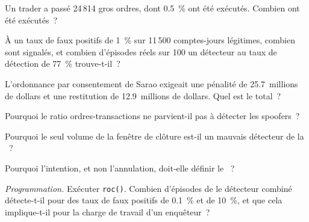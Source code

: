\begin{exercise}[$\star$]\label{exo:s2:manipulative-strategies-and-how-they-are-caught:1}
Un trader a passé 24\,814 gros ordres, dont 0.5~\% ont été exécutés. Combien ont été exécutés~?
\end{exercise}

\begin{exercise}[$\star$]\label{exo:s2:manipulative-strategies-and-how-they-are-caught:2}
À un taux de faux positifs de 1~\% sur 11\,500 comptes-jours légitimes, combien sont signalés, et combien d'épisodes réels sur 100 un détecteur au taux de
détection de 77~\% trouve-t-il~?
\end{exercise}

\begin{exercise}[$\star$]\label{exo:s2:manipulative-strategies-and-how-they-are-caught:3}
L'ordonnance par consentement de Sarao exigeait une pénalité de 25.7~millions de dollars et une restitution de 12.9~millions de dollars. Quel est le total~?
\end{exercise}

\begin{exercise}[$\star\star$]\label{exo:s2:manipulative-strategies-and-how-they-are-caught:4}
Pourquoi le ratio ordres-transactions ne parvient-il pas à détecter les spoofers~?
\end{exercise}

\begin{exercise}[$\star\star$]\label{exo:s2:manipulative-strategies-and-how-they-are-caught:5}
Pourquoi le seul volume de la fenêtre de clôture est-il un mauvais détecteur de la ~?
\end{exercise}

\begin{exercise}[$\star\star$]\label{exo:s2:manipulative-strategies-and-how-they-are-caught:6}
Pourquoi l'intention, et non l'annulation, doit-elle définir le ~?
\end{exercise}

\begin{exercise}[$\star\star\star$]\label{exo:s2:manipulative-strategies-and-how-they-are-caught:7}
\emph{Programmation.} Exécuter \texttt{roc()}. Combien d'épisodes de  le détecteur combiné détecte-t-il pour des taux de faux positifs de 0.1~\% et de 10~\%, et que
cela implique-t-il pour la charge de travail d'un enquêteur~?
\end{exercise}

